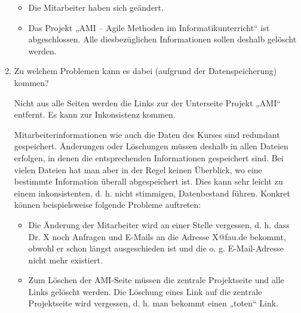 \documentclass{lehramt-informatik-aufgabe}
\begin{document}
\begin{enumerate}
\begin{itemize}
\item Die Mitarbeiter haben sich geändert.
\item Das Projekt „AMI – Agile Methoden im Informatikunterricht“ ist
abgeschlossen. Alle diesbezüglichen Informationen sollen deshalb
gelöscht werden.
\end{itemize}

\item Zu welchem Problemen kann es dabei (aufgrund der Datenspeicherung)
kommen?

\begin{liAntwort}
Nicht aus alle Seiten werden die Links zur der Unterseite Projekt „AMI“
entfernt. Es kann zur Inkonsistenz kommen.

Mitarbeiterinformationen wie auch die Daten des Kurses sind redundant
gespeichert. Änderungen oder Löschungen müssen deshalb in allen Dateien
erfolgen, in denen die entsprechenden Informationen gespeichert sind.
Bei vielen Dateien hat man aber in der Regel keinen Überblick, wo eine
bestimmte Information überall abgespeichert ist. Dies kann sehr leicht
zu einem inkonsistenten, d. h. nicht stimmigen, Datenbestand führen.
Konkret können beispielsweise folgende Probleme auftreten:

\begin{itemize}
\item Die Änderung der Mitarbeiter wird an einer Stelle vergessen, d. h.
dass \zB Dr. X noch Anfragen und E-Mails an die Adresse X@fau.de
bekommt, obwohl er schon längst ausgeschieden ist und die o. g.
E-Mail-Adresse nicht mehr existiert.

\item Zum Löschen der AMI-Seite müssen die zentrale Projektseite und
alle Links gelöscht werden. Die Löschung eines Link auf die zentrale
Projektseite wird vergessen, d. h. man bekommt einen „toten“ Link.
\end{itemize}
\end{liAntwort}
\end{enumerate}
\end{document}
